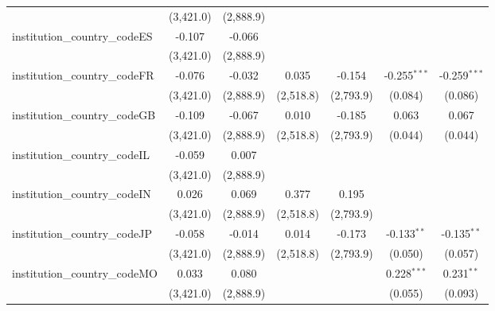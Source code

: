 \begin{tabular}{lcccccc}
                                         & (3,421.0)      & (2,888.9)      &               &               &                &   \\   
   institution\_country\_codeES          & -0.107         & -0.066         &               &               &                &   \\   
                                         & (3,421.0)      & (2,888.9)      &               &               &                &   \\   
   institution\_country\_codeFR          & -0.076         & -0.032         & 0.035         & -0.154        & -0.255$^{***}$ & -0.259$^{***}$\\   
                                         & (3,421.0)      & (2,888.9)      & (2,518.8)     & (2,793.9)     & (0.084)        & (0.086)\\   
   institution\_country\_codeGB          & -0.109         & -0.067         & 0.010         & -0.185        & 0.063          & 0.067\\   
                                         & (3,421.0)      & (2,888.9)      & (2,518.8)     & (2,793.9)     & (0.044)        & (0.044)\\   
   institution\_country\_codeIL          & -0.059         & 0.007          &               &               &                &   \\   
                                         & (3,421.0)      & (2,888.9)      &               &               &                &   \\   
   institution\_country\_codeIN          & 0.026          & 0.069          & 0.377         & 0.195         &                &   \\   
                                         & (3,421.0)      & (2,888.9)      & (2,518.8)     & (2,793.9)     &                &   \\   
   institution\_country\_codeJP          & -0.058         & -0.014         & 0.014         & -0.173        & -0.133$^{**}$  & -0.135$^{**}$\\   
                                         & (3,421.0)      & (2,888.9)      & (2,518.8)     & (2,793.9)     & (0.050)        & (0.057)\\   
   institution\_country\_codeMO          & 0.033          & 0.080          &               &               & 0.228$^{***}$  & 0.231$^{**}$\\   
                                         & (3,421.0)      & (2,888.9)      &               &               & (0.055)        & (0.093)\\   

\end{tabular}
